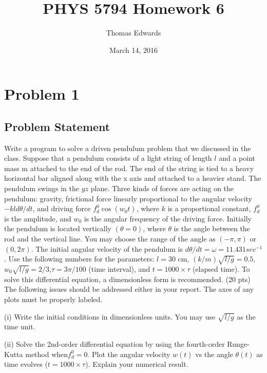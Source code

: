 \documentclass[10pt,letter]{article}
\begin{document}
\begin{titlepage}
\title{PHYS 5794 Homework 6}
\date{March 14, 2016}
\author{Thomas Edwards}
\maketitle
\end{titlepage}

\section{Problem 1}

\subsection{Problem Statement}

Write a program to solve a driven pendulum problem that we discussed in the class. Suppose that
a pendulum consists of a light string of length $l$ and a point mass m attached to the end of the
rod. The end of the string is tied to a heavy horizontal bar aligned along with the x axis and attached
to a heavier stand. The pendulum swings in the $yz$ plane. Three kinds of forces are acting
on the pendulum: gravity, frictional force linearly proportional to the angular velocity $-kld\theta/dt$,
and driving force $f_d^0\cos(w_0t)$, where $k$ is a proportional constant, $f_d^0$ is the amplitude, and $w_0$ is the
angular frequency of the driving force. Initially the pendulum is located vertically $(\theta = 0)$, where $\theta$
is the angle between the rod and the vertical line. You may choose the range of the angle as $(-\pi,
\pi)$ or $(0, 2\pi)$. The initial angular velocity of the pendulum is $d\theta/dt = \omega = 11.431 sec^{-1}$. Use the
following numbers for the parameters: $l=30$ cm, $(k/m)\sqrt{l/g} = 0.5$, $w_0\sqrt{l/g}=2/3$,$\tau=3\pi/100$ (time
interval), and $t = 1000 \times \tau$ (elapsed time). To solve this differential equation, a dimensionless form
is recommended. (20 pts)
The following issues should be addressed either in your report. The axes of any plots must be properly
labeled.

(i) Write the initial conditions in dimensionless units. You may use $\sqrt{l/g}$ as the time unit.

(ii) Solve the 2nd-order differential equation by using the fourth-order Runge-Kutta method
when$f_d^0= 0$. Plot the angular velocity $w(t)$ vs the angle $\theta(t)$ as time evolves ($t = 1000 \times \tau$).
Explain your numerical result.
\end{document}

